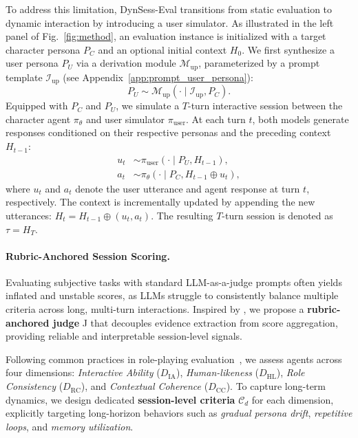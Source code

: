 To address this limitation, DynSess-Eval transitions from static evaluation to dynamic interaction by introducing a user simulator. As illustrated in the left panel of Fig.~\ref{fig:method}, an evaluation instance is initialized with a target character persona $P_C$ and an optional initial context $H_0$. 
We first synthesize a user persona $P_U$ via a derivation module $\mathcal{M}_{\text{up}}$, parameterized by a prompt template $\mathcal{I}_{\text{up}}$ (see Appendix~\ref{app:prompt_user_persona}):
\begin{equation}
P_U \sim \mathcal{M}_{\text{up}}(\cdot \mid \mathcal{I}_{\text{up}}, P_C).
\end{equation}
Equipped with $P_C$ and $P_U$, we simulate a $T$-turn interactive session between the character agent $\pi_\theta$ and  user simulator $\pi_{\text{user}}$. At each turn $t$, both models generate responses conditioned on their respective personas and the preceding context $H_{t-1}$:
\begin{equation}
\begin{split}
u_t &\sim \pi_{\text{user}}(\cdot \mid P_U, H_{t-1}), \\
a_t &\sim \pi_{\theta}(\cdot \mid P_C, H_{t-1} \oplus u_t),
\end{split}
\end{equation}
where $u_t$ and $a_t$ denote the user utterance and agent response at turn $t$, respectively. The context is incrementally updated by appending the new utterances: $H_t = H_{t-1} \oplus (u_t, a_t)$. The resulting $T$-turn session is denoted as $\tau = H_T$.

\paragraph{Rubric-Anchored Session Scoring.}
Evaluating subjective tasks with standard LLM-as-a-judge prompts often yields inflated and unstable scores, as LLMs struggle to consistently balance multiple criteria across long, multi-turn interactions. Inspired by \cite{wei2025rocketeval}, we propose a \textbf{rubric-anchored judge} J that decouples evidence extraction from score aggregation, providing reliable and interpretable session-level signals.

Following common practices in role-playing evaluation~\cite{zhou2025characterbench}, we assess agents across four dimensions: \textit{Interactive Ability} ($D_{\text{IA}}$), \textit{Human-likeness} ($D_{\text{HL}}$), \textit{Role Consistency} ($D_{\text{RC}}$), and \textit{Contextual Coherence} ($D_{\text{CC}}$). To capture long-term dynamics,  we design dedicated \textbf{session-level criteria} $\mathcal{C}_d$ for each dimension, explicitly targeting long-horizon behaviors such as \textit{gradual persona drift}, \textit{repetitive loops}, and \textit{memory utilization}.

